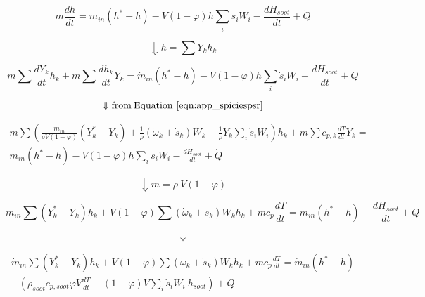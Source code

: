 \begin{equation*}
	m\frac{dh}{dt}={\dot{m}}_{in}\left(h^\ast-h\right)-V\left(1-\varphi\right)h\sum_{i}{{\dot{s}}_iW_i}-\frac{dH_{soot}}{dt}+\dot{Q}
\end{equation*}

\begin{equation*}
	\Downarrow h=\sum{Y_kh_k}
\end{equation*}

\begin{equation*}
	m\sum{\frac{dY_k}{dt}h_k}+m\sum{\frac{dh_k}{dt}Y_k}={\dot{m}}_{in}\left(h^\ast-h\right)-V\left(1-\varphi\right)h\sum_{i}{{\dot{s}}_iW_i}-\frac{dH_{soot}}{dt}+\dot{Q}
\end{equation*}

\begin{equation*}
	\Downarrow \mathrm{from \: Equation~\ref{eqn:app_spiciespsr}}
\end{equation*}


\begin{equation*}
	\begin{split}
	m\sum{\left(\frac{{\dot{m}}_{in}}{\rho V\left(1-\varphi\right)}\left(Y_k^\ast-Y_k\right)
		+
	\frac{1}{\rho}\left({\dot{\omega}}_k
	+
	{\dot{s}}_k\right)W_k-\frac{1}{\rho}Y_k\sum_{i}{{\dot{s}}_iW_i}\right)h_k}
	+
	m\sum{c_{p,k}\frac{dT}{dt}Y_k}
	=\\
	{\dot{m}}_{in}\left(h^\ast-h\right)-V\left(1-\varphi\right)h\sum_{i}{{\dot{s}}_iW_i}-\frac{dH_{soot}}{dt}+\dot{Q}
	\end{split}
\end{equation*}

\begin{equation*}
	\Downarrow m=\rho\ V\left(1-\varphi\right)
\end{equation*}

\begin{equation*}
	{\dot{m}}_{in}\sum\left(Y_k^\ast-Y_k\right)h_k+V\left(1-\varphi\right)\sum{\left({\dot{\omega}}_k+{\dot{s}}_k\right)W_kh_k}+mc_p\frac{dT}{dt}={\dot{m}}_{in}\left(h^\ast-h\right)-\frac{dH_{soot}}{dt}+\dot{Q}
\end{equation*}

\begin{equation*}
	\Downarrow
\end{equation*}

\begin{equation*}
	\begin{split}
	{\dot{m}}_{in}\sum\left(Y_k^\ast-Y_k\right)h_k
	+
	V\left(1-\varphi\right)\sum{\left({\dot{\omega}}_k
	+
	{\dot{s}}_k\right)W_kh_k}
	+
	mc_p\frac{dT}{dt}
	=
	{\dot{m}}_{in}\left(h^\ast-h\right)
	\\
	-\left(\rho_{soot}c_{p,soot}\varphi V\frac{dT}{dt}-\left(1-\varphi\right)V\sum_{i}{{\dot{s}}_iW_i}\ h_{soot}\right)+\dot{Q}
	\end{split}
\end{equation*}


